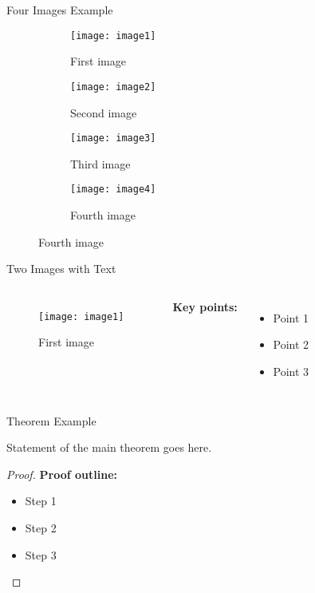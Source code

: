 \documentclass{beamer}
\begin{document}
\begin{frame}{Four Images Example}
\begin{figure}[h]
\centering
\begin{subfigure}{0.45\textwidth}
\texttt{[image: image1]}
\caption{First image}
\end{subfigure}
\hfill
\begin{subfigure}{0.45\textwidth}
\texttt{[image: image2]}
\caption{Second image}
\end{subfigure}
\vspace{0.5cm}
\begin{subfigure}{0.45\textwidth}
\texttt{[image: image3]}
\caption{Third image}
\end{subfigure}
\hfill
\begin{subfigure}{0.45\textwidth}
\texttt{[image: image4]}
\caption{Fourth image}
\end{subfigure}
\end{figure}
\end{frame}

\begin{frame}{Two Images with Text}
\begin{columns}
\begin{figure}
\texttt{[image: image1]}
\caption{First image}
\end{figure}
\textbf{Key points:}
\begin{itemize}
\item Point 1
\item Point 2
\item Point 3
\end{itemize}
\end{columns}
\end{frame}

\begin{frame}{Theorem Example}
\begin{theorem}
Statement of the main theorem goes here.
\end{theorem}

\begin{proof}
\textbf{Proof outline:}
\begin{itemize}
\item Step 1
\item Step 2
\item Step 3
\end{itemize}
\end{proof}
\end{frame}
\end{document}
